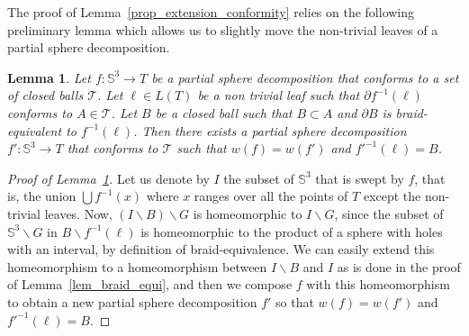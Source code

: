 \documentclass[11pt,a4paper]{article}
\newcommand{\Sp}{\mathbb S}
\newcommand{\T}{\mathcal{T}}
\newtheorem{lem}[theorem]{Lemma}
\begin{document}
The proof of Lemma~\ref{prop_extension_conformity} relies on the following preliminary lemma which allows us to slightly move the non-trivial leaves of a partial sphere decomposition.

\begin{lem}\label{lem_partial_truncate}
Let $f : \Sp^3 \rightarrow T$ be a partial sphere decomposition that conforms to a set of closed balls $\T$. Let $\ell \in L(T)$ be a non trivial leaf such that $\partial f^{-1} (\ell)$ conforms to $A \in \T$. Let $B$ be a closed ball such that $B \subset A$ and $\partial B$ is braid-equivalent to $f^{-1}(\ell)$. Then there exists a partial sphere decomposition $f' : \Sp^3 \rightarrow T$ that conforms to $\T$ such that $w(f) = w(f')$ and $f'^{-1} (\ell) = B$.
\end{lem}

\begin{proof}[Proof of Lemma~\ref{lem_partial_truncate}]
Let us denote by $I$ the subset of $\Sp^3$ that is swept by $f$, that is, the union $\bigcup f^{-1}(x)$ where $x$ ranges over all the points of $T$ except the non-trivial leaves. Now, $(I \smallsetminus B) \smallsetminus G$ is homeomorphic to $I \smallsetminus G$, since the subset of $\Sp^3 \smallsetminus G$ in $B \smallsetminus f^{-1}(\ell)$ is homeomorphic to the product of a sphere with holes with an interval, by definition of braid-equivalence. We can easily extend this homeomorphism to a homeomorphism between $I \smallsetminus B$ and $I$ as is done in the proof of Lemma~\ref{lem_braid_equi}, and then we compose $f$ with this homeomorphism to obtain a new partial sphere decomposition $f'$ so that $w(f)=w(f')$ and $f'^{-1}(\ell)=B$.
\end{proof}
\end{document}
